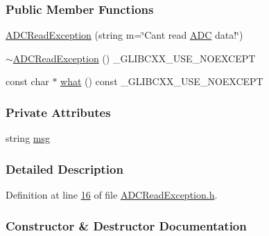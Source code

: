 \subsubsection*{Public Member Functions}
\begin{DoxyCompactItemize}
\item 
\hyperlink{class_hardware_1_1_exception_1_1_a_d_c_read_exception_aaa76cf7aa3fe32c27ea600c72ea4335a}{A\+D\+C\+Read\+Exception} (string m=\char`\"{}Can\textquotesingle{}t read \hyperlink{class_hardware_1_1_a_d_c}{A\+D\+C} data!\char`\"{})
\item 
\hyperlink{class_hardware_1_1_exception_1_1_a_d_c_read_exception_ad59cb380b2b8eee90a87a398a3511d50}{$\sim$\+A\+D\+C\+Read\+Exception} () \+\_\+\+G\+L\+I\+B\+C\+X\+X\+\_\+\+U\+S\+E\+\_\+\+N\+O\+E\+X\+C\+E\+P\+T
\item 
const char $\ast$ \hyperlink{class_hardware_1_1_exception_1_1_a_d_c_read_exception_aa2c8ee0d183837450a0dea15901e3dc4}{what} () const \+\_\+\+G\+L\+I\+B\+C\+X\+X\+\_\+\+U\+S\+E\+\_\+\+N\+O\+E\+X\+C\+E\+P\+T
\end{DoxyCompactItemize}
\subsubsection*{Private Attributes}
\begin{DoxyCompactItemize}
\item 
string \hyperlink{class_hardware_1_1_exception_1_1_a_d_c_read_exception_a42211528535b1f00abf6b86d8c3429c9}{msg}
\end{DoxyCompactItemize}


\subsubsection{Detailed Description}


Definition at line \hyperlink{_a_d_c_read_exception_8h_source_l00016}{16} of file \hyperlink{_a_d_c_read_exception_8h_source}{A\+D\+C\+Read\+Exception.\+h}.



\subsubsection{Constructor \& Destructor Documentation}
\hypertarget{class_hardware_1_1_exception_1_1_a_d_c_read_exception_aaa76cf7aa3fe32c27ea600c72ea4335a}{}
